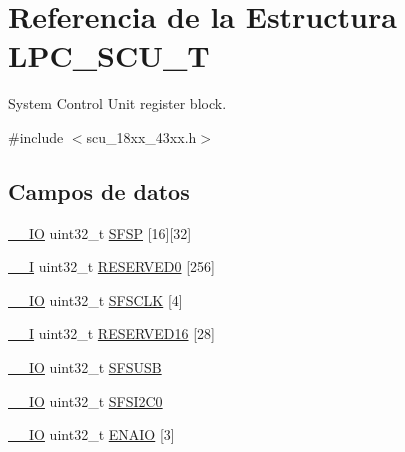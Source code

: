 \hypertarget{struct_l_p_c___s_c_u___t}{}\section{Referencia de la Estructura L\+P\+C\+\_\+\+S\+C\+U\+\_\+T}
\label{struct_l_p_c___s_c_u___t}


System Control Unit register block.  




{\ttfamily \#include $<$scu\+\_\+18xx\+\_\+43xx.\+h$>$}

\subsection*{Campos de datos}
\begin{DoxyCompactItemize}
\item 
\hyperlink{core__sc300_8h_aec43007d9998a0a0e01faede4133d6be}{\+\_\+\+\_\+\+IO} uint32\+\_\+t \hyperlink{struct_l_p_c___s_c_u___t_a6efb02bdfc10d2867b52dee82405e959}{S\+F\+SP} \mbox{[}16\mbox{]}\mbox{[}32\mbox{]}
\item 
\hyperlink{core__sc300_8h_af63697ed9952cc71e1225efe205f6cd3}{\+\_\+\+\_\+I} uint32\+\_\+t \hyperlink{struct_l_p_c___s_c_u___t_a22b6629c292698a196a20e7c7541e3a9}{R\+E\+S\+E\+R\+V\+E\+D0} \mbox{[}256\mbox{]}
\item 
\hyperlink{core__sc300_8h_aec43007d9998a0a0e01faede4133d6be}{\+\_\+\+\_\+\+IO} uint32\+\_\+t \hyperlink{struct_l_p_c___s_c_u___t_aba250050801fa2223ecf99d4c9215dc9}{S\+F\+S\+C\+LK} \mbox{[}4\mbox{]}
\item 
\hyperlink{core__sc300_8h_af63697ed9952cc71e1225efe205f6cd3}{\+\_\+\+\_\+I} uint32\+\_\+t \hyperlink{struct_l_p_c___s_c_u___t_a0581ecf82eacd79ff91f505f8e0fc668}{R\+E\+S\+E\+R\+V\+E\+D16} \mbox{[}28\mbox{]}
\item 
\hyperlink{core__sc300_8h_aec43007d9998a0a0e01faede4133d6be}{\+\_\+\+\_\+\+IO} uint32\+\_\+t \hyperlink{struct_l_p_c___s_c_u___t_aac42eb6179225f3d3326db08215aa1c3}{S\+F\+S\+U\+SB}
\item 
\hyperlink{core__sc300_8h_aec43007d9998a0a0e01faede4133d6be}{\+\_\+\+\_\+\+IO} uint32\+\_\+t \hyperlink{struct_l_p_c___s_c_u___t_afc428ad89fff4ba3953f7c1ddb745227}{S\+F\+S\+I2\+C0}
\item 
\hyperlink{core__sc300_8h_aec43007d9998a0a0e01faede4133d6be}{\+\_\+\+\_\+\+IO} uint32\+\_\+t \hyperlink{struct_l_p_c___s_c_u___t_a25ebb617d64b2c0d22ebfb1c97a65dbb}{E\+N\+A\+IO} \mbox{[}3\mbox{]}
\item 

\end{DoxyCompactItemize}
